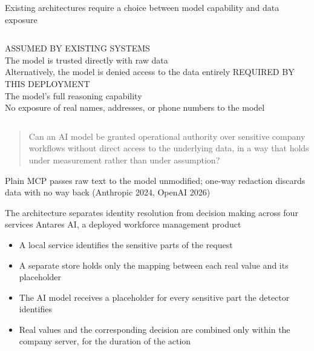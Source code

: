 \documentclass[aspectratio=169,11pt]{beamer}
\begin{document}
\begin{frame}{Existing architectures require a choice between model capability and data exposure}
  \small
  \begin{columns}[t]
      {\color{slidegray}\footnotesize ASSUMED BY EXISTING SYSTEMS}\\[1mm]
      The model is trusted directly with raw data\\[2mm]
      Alternatively, the model is denied access to the data entirely
      {\color{unitnred}\footnotesize REQUIRED BY THIS DEPLOYMENT}\\[1mm]
      The model's full reasoning capability\\[2mm]
      No exposure of real names, addresses, or phone numbers to the model
  \end{columns}
  \vspace{4mm}\pause
  \begin{quote}\itshape\footnotesize\raggedright
    Can an AI model be granted operational authority over sensitive company
    workflows without direct access to the underlying data, in a way that holds
    under measurement rather than under assumption?
  \end{quote}
  \vspace{2mm}
  {\footnotesize\color{slidegray} Plain MCP passes raw text to the model unmodified; one-way redaction discards data with no way back (Anthropic 2024, OpenAI 2026)}
\end{frame}

\begin{frame}{The architecture separates identity resolution from decision making across four services}
  \small
  Antares AI, a deployed workforce management product\\[3mm]
  \begin{itemize}
    \setlength{\itemsep}{0.3cm}
    \item A local service identifies the sensitive parts of the request
    \item A separate store holds only the mapping between each real value and its placeholder
    \item The AI model receives a placeholder for every sensitive part the detector identifies
    \item Real values and the corresponding decision are combined only within the company server, for the duration of the action
  \end{itemize}
\end{frame}
\end{document}
